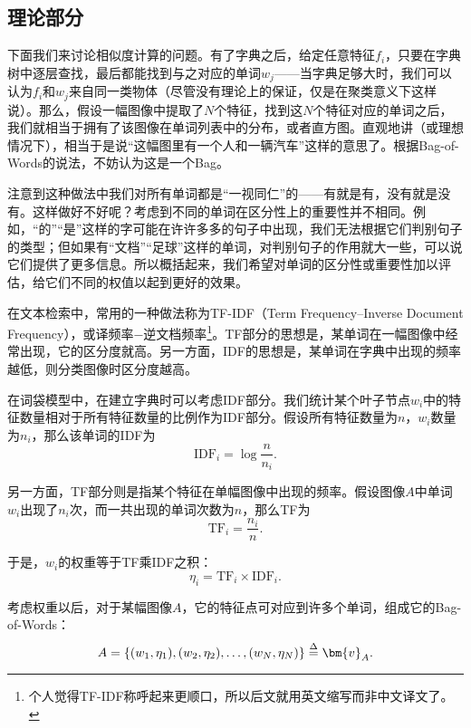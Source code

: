 \subsection{理论部分}
下面我们来讨论相似度计算的问题。有了字典之后，给定任意特征$f_i$，只要在字典树中逐层查找，最后都能找到与之对应的单词$w_j$——当字典足够大时，我们可以认为$f_i$和$w_j$来自同一类物体（尽管没有理论上的保证，仅是在聚类意义下这样说）。那么，假设一幅图像中提取了$N$个特征，找到这$N$个特征对应的单词之后，我们就相当于拥有了该图像在单词列表中的分布，或者直方图。直观地讲（或理想情况下），相当于是说“这幅图里有一个人和一辆汽车”这样的意思了。根据Bag-of-Words的说法，不妨认为这是一个Bag。

注意到这种做法中我们对所有单词都是“一视同仁”的——有就是有，没有就是没有。这样做好不好呢？考虑到不同的单词在区分性上的重要性并不相同。例如，“的”“是”这样的字可能在许许多多的句子中出现，我们无法根据它们判别句子的类型；但如果有“文档”“足球”这样的单词，对判别句子的作用就大一些，可以说它们提供了更多信息。所以概括起来，我们希望对单词的区分性或重要性加以评估，给它们不同的权值以起到更好的效果。

在文本检索中，常用的一种做法称为TF-IDF（Term  Frequency–Inverse Document Frequency）\textsuperscript{\cite{Sivic2003, Robertson2004}}，或译频率−逆文档频率\footnote{个人觉得TF-IDF称呼起来更顺口，所以后文就用英文缩写而非中文译文了。}。TF部分的思想是，某单词在一幅图像中经常出现，它的区分度就高。另一方面，IDF的思想是，某单词在字典中出现的频率越低，则分类图像时区分度越高。

在词袋模型中，在建立字典时可以考虑IDF部分。我们统计某个叶子节点$w_i$中的特征数量相对于所有特征数量的比例作为IDF部分。假设所有特征数量为$n$，$w_i$数量为$n_i$，那么该单词的IDF为
\begin{equation}
\mathrm{IDF}_i = \log \frac{n}{n_i}.
\end{equation}

另一方面，TF部分则是指某个特征在单幅图像中出现的频率。假设图像$A$中单词$w_i$出现了$n_i$次，而一共出现的单词次数为$n$，那么TF为
\begin{equation}
\mathrm{TF}_i = \frac{n_i}{n}.
\end{equation}

于是，$w_i$的权重等于TF乘IDF之积：
\begin{equation}
\eta_i = \mathrm{TF}_i \times \mathrm{IDF}_i.
\end{equation}

考虑权重以后，对于某幅图像$A$，它的特征点可对应到许多个单词，组成它的Bag-of-Words：
\begin{equation}
A = \left\{ (w_1, \eta_1), (w_2, \eta_2), \ldots, (w_N, \eta_N)  \right\} \buildrel \Delta \over = \bm{v}_A.
\end{equation}

